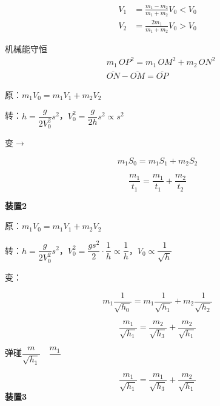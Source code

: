 
\begin{align*}
V_1&=\frac{m_1-m_2}{m_1+m_2}V_0<V_0\\
V_2&=\frac{2m_1}{m_1+m_2}V_0>V_0
\end{align*}

机械能守恒
\begin{align*}
& m_1\,OP^2=m_1\,OM^2+m_2\,ON^2\\
& \overline{ON}-\overline{OM}=\overline{OP}
\end{align*}

原：$m_1V_0=m_1V_1+m_2V_2$

转：$h=\dfrac{g}{2V_0^2}s^2$，\quad $V_0^2=\dfrac{g}{2h}s^2\propto s^2$

变$\to$
\begin{keybox}
\[m_1S_0=m_1S_1+m_2S_2\]
\end{keybox}

\begin{keybox}
\[\frac{m_1}{t_1}=\frac{m_1}{t_1}+\frac{m_2}{t_2}\] %
\end{keybox}
\textbf{装置2}


原：$m_1V_0=m_1V_1+m_2V_2$

转：$h=\dfrac{g}{2V_0^2}s^2$，\quad $V_0^2=\dfrac{gs^2}{2}\cdot\dfrac{1}{h}\propto\dfrac{1}{h}$，\quad $V_0\propto\dfrac{1}{\sqrt{h}}$

变：
\begin{keybox}
\[m_1\frac{1}{\sqrt{h_0}}=m_1\frac{1}{\sqrt{h_1}}+m_2\frac{1}{\sqrt{h_2}}\]
\end{keybox}

\[\frac{m_1}{\sqrt{h_1}}=\frac{m_2}{\sqrt{h_3}}+\frac{m_2}{\sqrt{h_1}}\] %

弹碰\quad $\dfrac{m}{\sqrt{h_1}}$\ \unclear{=}\ $\dfrac{m_1}{\ \ }$ %

\[\frac{m_1}{\sqrt{h_1}}=\frac{m_1}{\sqrt{h_3}}+\frac{m_2}{\sqrt{h_1}}\] %
\textbf{装置3}

